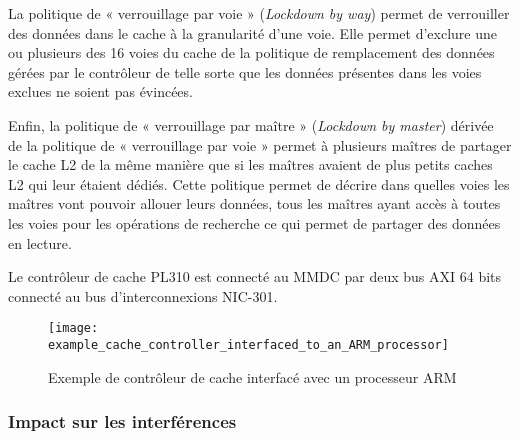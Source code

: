         La politique de « verrouillage par voie » (\emph{Lockdown by way}) permet de verrouiller des données dans le cache à la granularité d'une voie. Elle permet d'exclure une ou plusieurs des 16 voies du cache de la politique de remplacement des données gérées par le contrôleur de telle sorte que les données présentes dans les voies exclues ne soient pas évincées.

        Enfin, la politique de « verrouillage par maître » (\emph{Lockdown by master}) dérivée de la politique de « verrouillage par voie » permet à plusieurs maîtres de partager le cache L2 de la même manière que si les maîtres avaient de plus petits caches L2 qui leur étaient dédiés. Cette politique permet de décrire dans quelles voies les maîtres vont pouvoir allouer leurs données, tous les maîtres ayant accès à toutes les voies pour les opérations de recherche ce qui permet de partager des données en lecture.


        Le contrôleur de cache PL310 est connecté au MMDC par deux bus AXI 64 bits connecté au bus d'interconnexions NIC-301.

        \begin{figure}[!ht]
            \centering
            \texttt{[image: example\_cache\_controller\_interfaced\_to\_an\_ARM\_processor]}
            \caption{Exemple de contrôleur de cache interfacé avec un processeur ARM \cite{manuel:coreLink_level_2_cache_controller_L2C_310}}
            \label{fig:example_cache_controller_interfaced_to_an_ARM_processor}
        \end{figure}

        \subsubsection{Impact sur les interférences}


